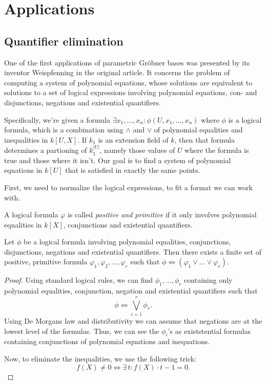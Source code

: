 \section{Applications}

\subsection{Quantifier elimination}
One of the first applications of parametric Gröbner bases was presented by its inventor Weispfenning \cite{Weispfenning} in the original article. It concerns the problem of computing a system of polynomial equations, whose solutions are equivalent to solutions to a set of logical expressions involving polynomial equations, con- and disjunctions, negations and existential quantifiers.

Specifically, we're given a formula $\exists x_{1}, \dots, x_{n} : \phi(U, x_{1}, \dots, x_{n})$ where $\phi$ is a logical formula, which is a combination using $\land$ and $\lor$ of polynomial equalities and inequalities in $k[U, X]$. If $k_{1}$ is an extension field of $k$, then that formula determines a partioning of $k_{1}^{|U|}$, namely those values of $U$ where the formula is true and those where it isn't. Our goal is to find a system of polynomial equations in $k[U]$ that is satisfied in exactly the same points.

First, we need to normalize the logical expressions, to fit a format we can work with.

\begin{definition}
  A logical formula $\varphi$ is called \textit{positive and primitive} if it only involves polynomial equalities in $k[X]$, conjunctions and existential quantifiers.
\end{definition}

\begin{lemma}\label{lem:logical_positive}
  Let $\phi$ be a logical formula involving polynomial equalities, conjunctions, disjunctions, negations and existential quantifiers. Then there exists a finite set of positive, primitive formula $\varphi_{1}, \varphi_{2}, \dots, \varphi_{r}$ such that $\phi \iff (\varphi_{1} \lor \dots \lor \varphi_{r})$.
\end{lemma}
\begin{proof}
  Using standard logical rules, we can find $\phi_{1}, \dots, \phi_{r}$ containing only polynomial equalities, conjunction, negation and existential quantifiers such that \[\phi \iff \bigvee_{i=1}^{r} \phi_{r}.\] Using De Morgans law and distributivity we can assume that negations are at the lowest level of the formulas. Thus, we can see the $\phi_{i}$'s as existstential formulas containing conjunctions of polynomial equations and inequations.

  Now, to eliminate the inequalities, we use the following trick: \[f(X) \neq 0 \iff \exists\, t : f(X) \cdot t - 1 = 0.\]
\end{proof}

